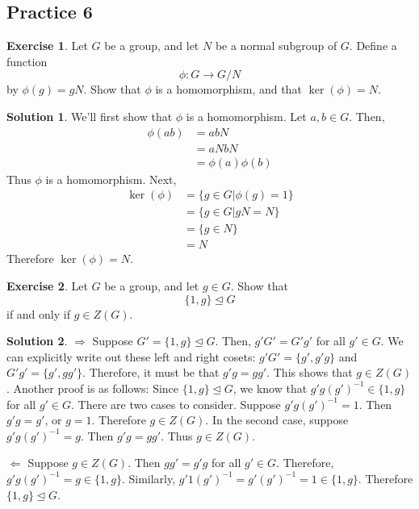 \documentclass[12pt]{article}
\theoremstyle{definition}
\newtheorem{exercise}{\color{YellowOrange}Exercise}
\theoremstyle{definition}
\newtheorem{solution}{\color{Goldenrod}Solution}
\begin{document}
\subsection{Practice 6}
\begin{exercise}
	Let $G$ be a group, and let $N$ be a normal subgroup of $G$. Define a function 
	\begin{equation}
		\phi : G \to G / N
	\end{equation}
	by $\phi(g) = gN$. Show that $\phi$ is a homomorphism, and that $\ker(\phi) = N$.
\end{exercise}
\begin{solution}
	We'll first show that $\phi$ is a homomorphism. Let $a,b \in G$. Then,
	\begin{align*}
	\phi(ab) &= abN \\
	&= aNbN \tag{definition of multiplication on quotient groups} \\
	&= \phi(a)\phi(b) 
	\end{align*}
	Thus $\phi$ is a homomorphism. Next,
	\begin{align*}
	\ker(\phi) &= \{ g \in G | \phi(g) = 1 \} \\
	&= \{ g \in G | gN = N \} \\
	&= \{ g \in N \} \\
	&= N
	\end{align*}
	Therefore $\ker(\phi) = N$. 
\end{solution}

\begin{exercise}
	Let $G$ be a group, and let $g \in G$. Show that 
	\begin{equation}
		\{1, g\} \trianglelefteq G
	\end{equation}
	if and only if $g \in Z(G)$. 
\end{exercise}
\begin{solution}
	$\Rightarrow$ Suppose $G' = \{1, g\} \trianglelefteq G$. Then, $g'G' = G'g'$ for all $g' \in G$. We can explicitly write out these left and right cosets: $g'G' = \{g', g'g \}$ and $G'g' = \{g', gg'\}$. Therefore, it must be that $g'g = gg'$. This shows that $g \in Z(G)$. Another proof is as follows: Since $\{1, g\} \trianglelefteq G$, we know that $g'g(g')^{-1} \in \{1, g\}$ for all $g' \in G$. There are two cases to consider. Suppose $g' g (g')^{-1} = 1$. Then $g'g = g'$, or $g = 1$. Therefore $g \in Z(G)$. In the second case, suppose $g' g (g')^{-1} = g$. Then $g'g = gg'$. Thus $g \in Z(G)$. 

	$\Leftarrow$ Suppose $g \in Z(G)$. Then $gg' = g'g$ for all $g' \in G$. Therefore, $g'g(g')^{-1} = g \in \{1, g\}$. Similarly, $g'1(g')^{-1} = g'(g')^{-1} = 1 \in \{1, g\}$. Therefore $\{1, g\} \trianglelefteq G$.
\end{solution}
\end{document}
